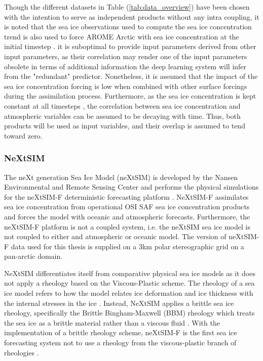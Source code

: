 \documentclass[../main/thesis.tex]{subfiles}
\begin{document}
Though the different datasets in Table (\ref{tab:data_overview}) have been chosen with the intention to serve as independent products without any intra coupling, it is noted that the sea ice observations used to compute the sea ice concentration trend \citep{Tonboe2017} is also used to force AROME Arctic with sea ice concentration at the initial timestep \citep{Mueller2017}. it is suboptimal to provide input parameters derived from other input parameters, as their correlation may render one of the input parameters obsolete in terms of additional information the deep learning system will infer from the "redundant" predictor. Nonetheless, it is assumed that the impact of the sea ice concentration forcing is low when combined with other surface forcings during the assimilation process. Furthermore, as the sea ice concentration is kept constant at all timesteps \citep{Mueller2017}, the correlation between sea ice concentration and atmospheric variables can be assumed to be decaying with time. Thus, both products will be used as input variables, and their overlap is assumed to tend toward zero.


\subsubsection{NeXtSIM}
\label{sec:nextsim}
The neXt generation Sea Ice Model (neXtSIM) is developed by the Nansen Environmental and Remote Sensing Center and performs the physical simulations for the neXtSIM-F deterministic forecasting platform \citep{Williams2021}. NeXtSIM-F assimilates sea ice concentration from operational OSI SAF sea ice concentration products \citep{Tonboe2017, Lavelle2016} and forces the model with oceanic and atmospheric forecasts. Furthermore, the neXtSIM-F platform is not a coupled system, i.e. the neXtSIM sea ice model is not coupled to either and atmospheric or oceanic model. The version of neXtSIM-F data used for this thesis is supplied on a 3km polar stereographic grid on a pan-arctic domain. 

NeXtSIM differentiates itself from comparative physical sea ice models as it does not apply a rheology based on the Viscous-Plastic scheme. The rheology of a sea ice model refers to how the model relates ice deformation and ice thickness with the internal stresses in the ice \citep{Hibler1979}. Instead, NeXtSIM applies a brittle sea ice rheology, specifically the Brittle Bingham-Maxwell (BBM) rheology which treats the sea ice as a brittle material rather than a viscous fluid \citep{Olason2022}. With the implementation of a brittle rheology scheme, neXtSIM-F is the first sea ice forecasting system not to use a rheology from the viscous-plastic branch of rheologies \citep{Williams2021}.
\end{document}
